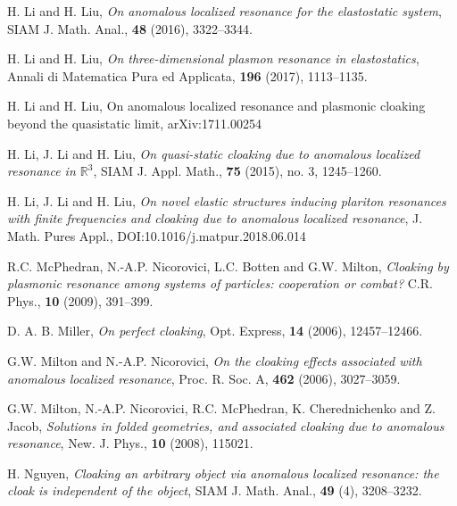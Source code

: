 \documentclass[11pt,reqno,twoside]{amsart}
\theoremstyle{definition}
\theoremstyle{remark}
\numberwithin{equation}{section}
\begin{document}
\begin{thebibliography}{99}
 {H. Li and H. Liu}, \emph{On anomalous localized resonance for the elastostatic system}, SIAM J. Math. Anal., {\bf 48} (2016), 3322--3344.

 {H. Li and H. Liu}, \emph{On three-dimensional plasmon resonance in elastostatics},
Annali di Matematica Pura ed Applicata, {\bf 196} (2017), 1113--1135.

 {H. Li and H. Liu}, On anomalous localized resonance and plasmonic cloaking beyond the quasistatic limit, {arXiv:1711.00254}

 {H. Li, J. Li and H. Liu}, \emph{On quasi-static cloaking due to anomalous localized resonance in $\mathbb{R}^3$}, SIAM J. Appl. Math., {\bf 75}  (2015), no. 3, 1245--1260.

 {H. Li, J. Li and H. Liu}, {\it On novel elastic structures inducing plariton resonances with finite frequencies and cloaking due to anomalous localized resonance}, {J. Math. Pures Appl.}, DOI:10.1016/j.matpur.2018.06.014


 {R.C. McPhedran, N.-A.P. Nicorovici, L.C. Botten and G.W. Milton}, \emph{Cloaking by plasmonic
resonance among systems of particles: cooperation or combat?} C.R. Phys., {\bf 10} (2009), 391--399.

 {D. A. B. Miller}, \emph{On perfect cloaking}, Opt. Express, {\bf 14} (2006), 12457--12466.

 {G.W. Milton and N.-A.P. Nicorovici}, \emph{On the cloaking effects associated with anomalous
localized resonance}, Proc. R. Soc. A, {\bf 462} (2006), 3027--3059.

 {G.W. Milton, N.-A.P. Nicorovici, R.C. McPhedran, K. Cherednichenko and Z. Jacob},
\emph{Solutions in folded geometries, and associated cloaking due to anomalous resonance}, New. J. Phys., {\bf 10} (2008), 115021.


 H. Nguyen, \emph{Cloaking an arbitrary object via anomalous localized resonance: the cloak is independent of the object}, SIAM J. Math. Anal., {\bf 49} (4), 3208--3232.  


\end{thebibliography}
\end{document}
